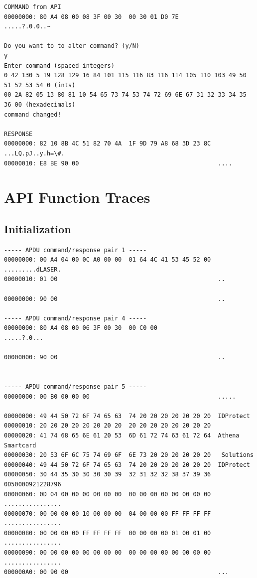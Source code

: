 \documentclass[bsc,frontabs,twoside,singlespacing,parskip,deptreport]{infthesis}     %
\begin{document}
\begin{appendices}
\begin{Verbatim}[commandchars=\\\{\}, fontsize=\small]
COMMAND from API
00000000: 80 A4 08 00 08 3F 00 30  00 30 01 D0 7E           .....?.0.0..~

Do you want to to alter command? (y/N)
y
Enter command (spaced integers)
0 42 130 5 19 128 129 16 84 101 115 116 83 116 114 105 110 103 49 50 51 52 53 54 0 (ints)
00 2A 82 05 13 80 81 10 54 65 73 74 53 74 72 69 6E 67 31 32 33 34 35 36 00 (hexadecimals)
command changed!

RESPONSE
00000000: 82 10 8B 4C 51 82 70 4A  1F 9D 79 A8 68 3D 23 8C  ...LQ.pJ..y.h=\#.
00000010: E8 BE 90 00                                       ....
\end{Verbatim}

\chapter{API Function Traces}

\section{Initialization}
\begin{Verbatim}[commandchars=\\\{\}, fontsize=\small]
----- APDU command/response pair 1 -----
00000000: 00 A4 04 00 0C A0 00 00  01 64 4C 41 53 45 52 00  .........dLASER.
00000010: 01 00                                             ..

00000000: 90 00                                             ..

----- APDU command/response pair 4 -----
00000000: 80 A4 08 00 06 3F 00 30  00 C0 00                 .....?.0...

00000000: 90 00                                             ..


----- APDU command/response pair 5 -----
00000000: 00 B0 00 00 00                                    .....

00000000: 49 44 50 72 6F 74 65 63  74 20 20 20 20 20 20 20  IDProtect       
00000010: 20 20 20 20 20 20 20 20  20 20 20 20 20 20 20 20                  
00000020: 41 74 68 65 6E 61 20 53  6D 61 72 74 63 61 72 64  Athena Smartcard
00000030: 20 53 6F 6C 75 74 69 6F  6E 73 20 20 20 20 20 20   Solutions      
00000040: 49 44 50 72 6F 74 65 63  74 20 20 20 20 20 20 20  IDProtect       
00000050: 30 44 35 30 30 30 30 39  32 31 32 32 38 37 39 36  0D50000921228796
00000060: 0D 04 00 00 00 00 00 00  00 00 00 00 00 00 00 00  ................
00000070: 00 00 00 00 10 00 00 00  04 00 00 00 FF FF FF FF  ................
00000080: 00 00 00 00 FF FF FF FF  00 00 00 00 01 00 01 00  ................
00000090: 00 00 00 00 00 00 00 00  00 00 00 00 00 00 00 00  ................
000000A0: 00 90 00                                          ...



\end{Verbatim}
\end{appendices}
\end{document}
